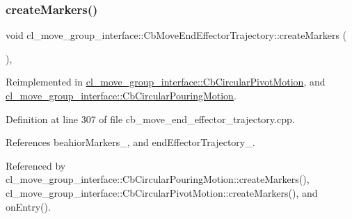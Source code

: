 \mbox{\label{classcl__move__group__interface_1_1CbMoveEndEffectorTrajectory_a442efa1d5bc9e9a16f74ecd31b13d9b5}} 
\subsubsection{\texorpdfstring{create\+Markers()}{createMarkers()}}
{\footnotesize\ttfamily void cl\+\_\+move\+\_\+group\+\_\+interface\+::\+Cb\+Move\+End\+Effector\+Trajectory\+::create\+Markers (\begin{DoxyParamCaption}{ }\end{DoxyParamCaption})\hspace{0.3cm}{\ttfamily [protected]}, {\ttfamily [virtual]}}



Reimplemented in \hyperlink{classcl__move__group__interface_1_1CbCircularPivotMotion_a48911ad62608cb00c04e979e2f6f644a}{cl\+\_\+move\+\_\+group\+\_\+interface\+::\+Cb\+Circular\+Pivot\+Motion}, and \hyperlink{classcl__move__group__interface_1_1CbCircularPouringMotion_a26d603b1d9bdbf5b71da6c1c4af2c322}{cl\+\_\+move\+\_\+group\+\_\+interface\+::\+Cb\+Circular\+Pouring\+Motion}.



Definition at line 307 of file cb\+\_\+move\+\_\+end\+\_\+effector\+\_\+trajectory.\+cpp.



References beahior\+Markers\+\_\+, and end\+Effector\+Trajectory\+\_\+.



Referenced by cl\+\_\+move\+\_\+group\+\_\+interface\+::\+Cb\+Circular\+Pouring\+Motion\+::create\+Markers(), cl\+\_\+move\+\_\+group\+\_\+interface\+::\+Cb\+Circular\+Pivot\+Motion\+::create\+Markers(), and on\+Entry().


